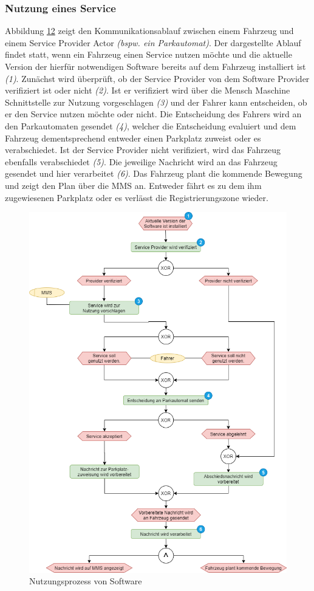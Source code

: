 \subsubsection{Nutzung eines Service}\label{serviceUse}
Abbildung \hyperref[img:nutzung]{12} zeigt den Kommunikationsablauf zwischen einem Fahrzeug und einem Service Provider Actor \textit{(bspw. ein Parkautomat)}. Der dargestellte Ablauf findet statt, wenn ein Fahrzeug einen Service nutzen möchte und die aktuelle Version der hierfür notwendigen Software bereits auf dem Fahrzeug installiert ist \textit{(1)}. Zunächst wird überprüft, ob der Service Provider von dem Software Provider verifiziert ist oder nicht \textit{(2)}. Ist er verifiziert wird über die Mensch Maschine Schnittstelle zur Nutzung vorgeschlagen \textit{(3)} und der Fahrer kann entscheiden, ob er den Service nutzen möchte oder nicht. Die Entscheidung des Fahrers wird an den Parkautomaten gesendet \textit{(4)}, welcher die Entscheidung evaluiert und dem Fahrzeug dementsprechend entweder einen Parkplatz zuweist oder es verabschiedet. Ist der Service Provider nicht verifiziert, wird das Fahrzeug ebenfalls verabschiedet \textit{(5)}. Die jeweilige Nachricht wird an das Fahrzeug gesendet und hier verarbeitet \textit{(6)}. Das Fahrzeug plant die kommende Bewegung und zeigt den Plan über die MMS an. Entweder fährt es zu dem ihm zugewiesenen Parkplatz oder es verlässt die Registrierungszone wieder.
\begin{figure}[!h]
	\centering
	\includegraphics[width=0.95\columnwidth]{pictures/konzept-Nutzungsprozess.png}
	\caption{Nutzungsprozess von Software}
	\label{img:nutzung}
\end{figure}
\clearpage

